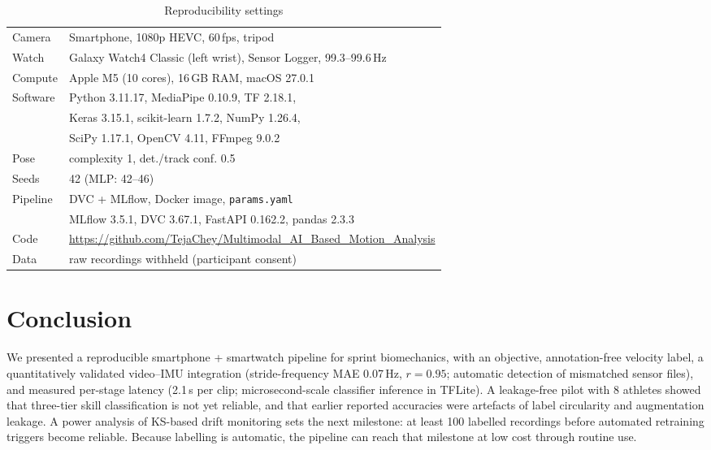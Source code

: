 \begin{table}[t]
\caption{Reproducibility settings}\label{tab:repro}
\centering\small
\begin{tabular}{ll}
\hline
Camera & Smartphone, 1080p HEVC, 60\,fps, tripod\\
Watch & Galaxy Watch4 Classic (left wrist), Sensor Logger, 99.3--99.6\,Hz\\
Compute & Apple M5 (10 cores), 16\,GB RAM, macOS 27.0.1\\
Software & Python 3.11.17, MediaPipe 0.10.9, TF 2.18.1,\\
 & Keras 3.15.1, scikit-learn 1.7.2, NumPy 1.26.4,\\
 & SciPy 1.17.1, OpenCV 4.11, FFmpeg 9.0.2\\
Pose & complexity 1, det./track conf. 0.5\\
Seeds & 42 (MLP: 42--46)\\
Pipeline & DVC + MLflow, Docker image, \texttt{params.yaml}\\
 & MLflow 3.5.1, DVC 3.67.1, FastAPI 0.162.2, pandas 2.3.3\\
Code & \url{https://github.com/TejaChey/Multimodal_AI_Based_Motion_Analysis}\\
Data & raw recordings withheld (participant consent)\\
\hline
\end{tabular}
\end{table}

\section{Conclusion}
We presented a reproducible smartphone + smartwatch pipeline for sprint
biomechanics, with an objective, annotation-free velocity label, a
quantitatively validated video--IMU integration (stride-frequency MAE
0.07\,Hz, $r=0.95$; automatic detection of mismatched sensor files), and
measured per-stage latency (2.1\,s per clip; microsecond-scale classifier
inference in TFLite). A leakage-free pilot with 8 athletes showed that
three-tier skill classification is not yet reliable, and that earlier
reported accuracies were artefacts of label circularity and augmentation
leakage. A power analysis of KS-based drift monitoring sets the next
milestone: at least 100 labelled recordings before automated retraining
triggers become reliable. Because labelling is automatic, the pipeline can
reach that milestone at low cost through routine use.
